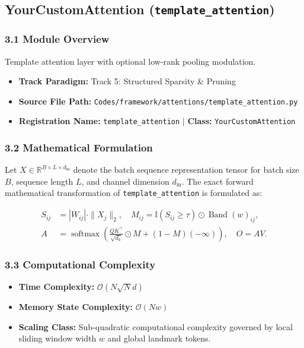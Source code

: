 \subsection{YourCustomAttention (\texttt{template\_attention})}
\label{sec:app_module_template_attention}

\subsubsection*{3.1 Module Overview}
Template attention layer with optional low-rank pooling modulation.
\begin{itemize}
    \item \textbf{Track Paradigm:} Track 5: Structured Sparsity \& Pruning
    \item \textbf{Source File Path:} \texttt{Codes/framework/attentions/template\_attention.py}
    \item \textbf{Registration Name:} \texttt{template\_attention} $\mid$ \textbf{Class:} \texttt{YourCustomAttention}
\end{itemize}

\subsubsection*{3.2 Mathematical Formulation}
Let $X \in \mathbb{R}^{B \times L \times d_{\text{in}}}$ denote the batch sequence representation tensor for batch size $B$, sequence length $L$, and channel dimension $d_{\text{in}}$. The exact forward mathematical transformation of \texttt{template\_attention} is formulated as:

\begin{align}
S_{ij} &= |W_{ij}| \cdot \|X_j\|_2, \quad M_{ij} = \mathbb{I}(S_{ij} \ge \tau) \odot \operatorname{Band}(w)_{ij}, \\
A &= \operatorname{softmax}\left(\frac{Q K^\top}{\sqrt{d_k}} \odot M + (1 - M)(-\infty)\right), \quad O = A V.
\end{align}


\subsubsection*{3.3 Computational Complexity}
\begin{itemize}
    \item \textbf{Time Complexity:} $\mathcal{O}(N \sqrt{N} d)$
    \item \textbf{Memory State Complexity:} $\mathcal{O}(N w)$
    \item \textbf{Scaling Class:} Sub-quadratic computational complexity governed by local sliding window width $w$ and global landmark tokens.
\end{itemize}

